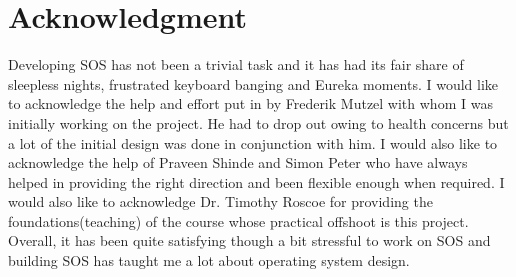 \documentclass[a4paper, 11pt]{article}
\begin{document}
\section{Acknowledgment}
Developing SOS has not been a trivial task and it has had its fair
share of sleepless nights, frustrated keyboard banging and Eureka
moments. I would like to acknowledge the help and effort put in by
Frederik Mutzel with whom I was initially working on the project. He
had to drop out owing to health concerns but a lot of the initial
design was done in conjunction with him. I would also like to
acknowledge the help of Praveen Shinde and Simon Peter who have always
helped in providing the right direction and been flexible enough when
required. I would also like to acknowledge Dr. Timothy Roscoe for
providing the foundations(teaching) of the course whose practical offshoot is
this project. Overall, it has been quite satisfying though a bit stressful
to work on SOS and building SOS has taught me a lot about operating
system design.
\newpage


\end{document}
